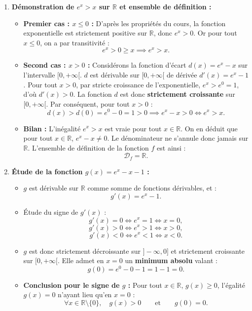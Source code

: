 \documentclass[11pt,a4paper]{article}
\newcommand{\R}{\mathbb{R}}
\begin{document}
\begin{correctionbox}[Exercice 7]
\begin{enumerate}[label=\textbf{\arabic*.}]
    \item \textbf{Démonstration de $e^x > x$ sur $\R$ et ensemble de définition :}
    \begin{itemize}
        \item \textbf{Premier cas : $x \le 0$ :}
        D'après les propriétés du cours, la fonction exponentielle est strictement positive sur $\R$, donc $e^x > 0$.
        Or pour tout $x \le 0$, on a par transitivité :
        \[
        e^x > 0 \ge x \implies e^x > x.
        \]
        \item \textbf{Second cas : $x > 0$ :}
        Considérons la fonction d'écart $d(x) = e^x - x$ sur l'intervalle $[0, +\infty[$.
        $d$ est dérivable sur $[0, +\infty[$ de dérivée $d'(x) = e^x - 1$.
        Pour tout $x > 0$, par stricte croissance de l'exponentielle, $e^x > e^0 = 1$, d'où $d'(x) > 0$.
        La fonction $d$ est donc \textbf{strictement croissante} sur $[0, +\infty[$.
        Par conséquent, pour tout $x > 0$ :
        \[
        d(x) > d(0) = e^0 - 0 = 1 > 0 \implies e^x - x > 0 \iff e^x > x.
        \]
        \item \textbf{Bilan :} L'inégalité $e^x > x$ est vraie pour tout $x \in \R$.
        On en déduit que pour tout $x \in \R$, $e^x - x \neq 0$. Le dénominateur ne s'annule donc jamais sur $\R$.
        L'ensemble de définition de la fonction $f$ est ainsi :
        \[
        \boxed{\mathcal{D}_f = \R}.
        \]
    \end{itemize}

    \item \textbf{Étude de la fonction $g(x) = e^x - x - 1$ :}
    \begin{itemize}
        \item $g$ est dérivable sur $\R$ comme somme de fonctions dérivables, et :
        \[
        g'(x) = e^x - 1.
        \]
        \item Étude du signe de $g'(x)$ :
        \[
        g'(x) = 0 \iff e^x = 1 \iff x = 0,
        \]
        \[
        g'(x) > 0 \iff e^x > 1 \iff x > 0,
        \]
        \[
        g'(x) < 0 \iff e^x < 1 \iff x < 0.
        \]
        \item $g$ est donc strictement décroissante sur $]-\infty, 0]$ et strictement croissante sur $[0, +\infty[$.
        Elle admet en $x = 0$ un \textbf{minimum absolu} valant :
        \[
        g(0) = e^0 - 0 - 1 = 1 - 1 = 0.
        \]
        \item \textbf{Conclusion pour le signe de $g$ :}
        Pour tout $x \in \R$, $g(x) \ge 0$, l'égalité $g(x) = 0$ n'ayant lieu qu'en $x = 0$ :
        \[
        \forall x \in \R \setminus \{0\}, \quad g(x) > 0 \qquad \text{et} \qquad g(0) = 0.
        \]
    \end{itemize}


\end{enumerate}
\end{correctionbox}
\end{document}
